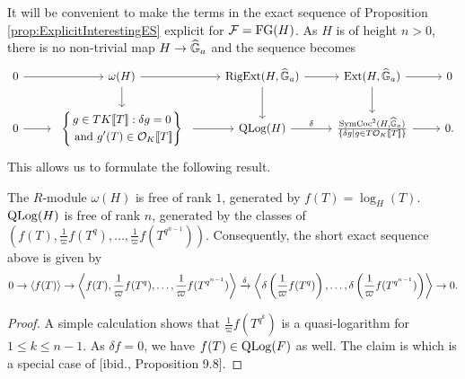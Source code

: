 \documentclass[../main.tex]{subfiles}
\begin{document}
It will be convenient to make the terms in the exact sequence of Proposition 
\ref{prop:ExplicitInterestingES} explicit for $\mathcal{F} = \textnormal{FG}(H)$. As $H$ is of height $n>0$, 
there is no non-trivial map $H \to \widehat{\mathbb{G}}_a$ and the sequence becomes
\begin{equation*}
\begin{tikzcd}[ampersand replacement=\&]
	0 \& {\omega(H)} \& {\RigExt(H,\Ghat_a)} \& {\Ext(H,\Ghat_a)} \& 0 \\
	0 \& \begin{array}{c} \left\{\begin{gathered} {g \in TK\llbr T \rrbr : \delta g = 0} \\          \text{ and $g'(T) \in \cO_K\llbr T \rrbr$}\end{gathered} \right\} \end{array} \& {\QLog(H)} \& {\frac{\SymCoc^2(H, \Ghat_a)}{\{\delta g \mid g \in T \cO_K\llbr T \rrbr\}}} \& 0.
	\arrow[from=1-1, to=1-2]
	\arrow[from=1-2, to=1-3]
	\arrow[from=1-2, to=2-2]
	\arrow[from=1-3, to=1-4]
	\arrow[from=1-3, to=2-3]
	\arrow[from=1-4, to=1-5]
	\arrow[from=1-4, to=2-4]
	\arrow["", from=2-1, to=2-2]
	\arrow[from=2-2, to=2-3]
	\arrow["\delta", from=2-3, to=2-4]
	\arrow[from=2-4, to=2-5]
\end{tikzcd}   
\end{equation*}
This allows us to formulate the following result.
\begin{prop}
  The $R$-module $\omega(H)$ is free of rank $1$, generated by 
  $f(T) = \log_H(T)$. $\operatorname {QLog}(H)$ is free of rank $n$, generated by the classes of
  $(f(T), \frac 1\varpi f(T^q), \dots, \frac 1\varpi f(T^{q^{n-1}}))$. Consequently,
  the short exact sequence above is given by 
  \begin{equation*}
    0 \to \left \langle f(T) \right \rangle \to \left \langle f(T), \frac 1\varpi
      f(T^q) , \dots,
    \frac 1\varpi f(T^{q^{n-1}}) \right \rangle \xrightarrow{\delta} 
    \left \langle \delta \left(\frac 1\varpi f(T^q)\right),\dots, \delta
    \left(\frac 1\varpi f(T^{q^{n-1}})\right ) \right \rangle \to 0.
  \end{equation*}
\begin{proof}
  A simple calculation shows that $\frac 1\varpi f(T^{q^k})$ is a quasi-logarithm for 
  $1 \leq k \leq n-1$. As $\delta f = 0$, we have $f(T) \in \operatorname {QLog}(F)$ as well. 
  The claim is \cite[Proposition 13.8]{hopkins1994equivariant} which is a 
  special case of [ibid., Proposition 9.8].
\end{proof}
\end{prop}
\end{document}
